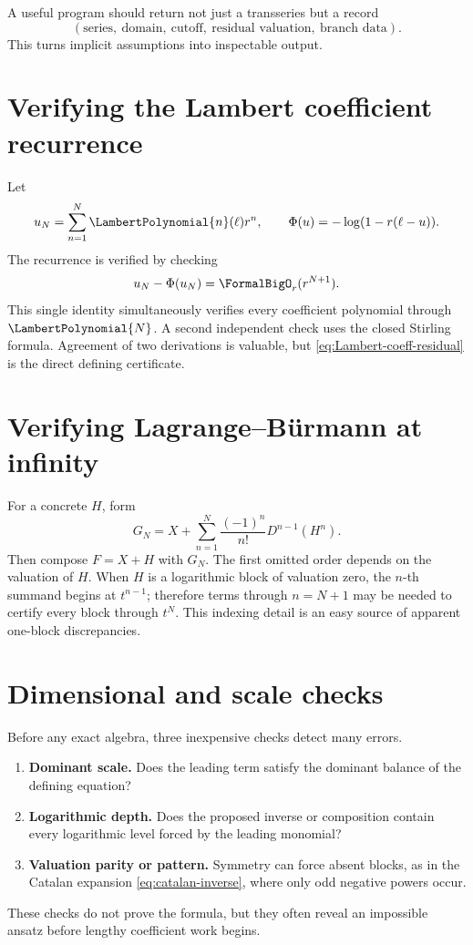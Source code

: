 \documentclass[11pt,openany]{book}
\theoremstyle{definition}
\theoremstyle{plain}
\theoremstyle{remark}
\begin{document}
\begin{algorithmicbox}
A useful program should return not just a transseries but a record
\[
 (\text{series},\ \text{domain},\ \text{cutoff},\ \text{residual valuation},\ \text{branch data}).
\]
This turns implicit assumptions into inspectable output.
\end{algorithmicbox}

\section{Verifying the Lambert coefficient recurrence}
Let
\[
 u_N=\sum_{n=1}^{N}\LambertPolynomial{n}(\ell)r^n,
 \qquad
 \Phi(u)=-\log(1-r(\ell-u)).
\]
The recurrence is verified by checking
\begin{equation}\label{eq:Lambert-coeff-residual}
 u_N-\Phi(u_N)=\FormalBigO_r(r^{N+1}).
\end{equation}
This single identity simultaneously verifies every coefficient polynomial through \(\LambertPolynomial{N}\). A second independent check uses the closed Stirling formula. Agreement of two derivations is valuable, but \cref{eq:Lambert-coeff-residual} is the direct defining certificate.

\section{Verifying Lagrange--B\"urmann at infinity}
For a concrete \(H\), form
\[
 G_N=X+\sum_{n=1}^{N}\frac{(-1)^n}{n!}D^{n-1}(H^n).
\]
Then compose \(F=X+H\) with \(G_N\). The first omitted order depends on the valuation of \(H\). When \(H\) is a logarithmic block of valuation zero, the \(n\)-th summand begins at \(t^{n-1}\); therefore terms through \(n=N+1\) may be needed to certify every block through \(t^N\). This indexing detail is an easy source of apparent one-block discrepancies.

\section{Dimensional and scale checks}
Before any exact algebra, three inexpensive checks detect many errors.
\begin{enumerate}
\item \textbf{Dominant scale.} Does the leading term satisfy the dominant balance of the defining equation?
\item \textbf{Logarithmic depth.} Does the proposed inverse or composition contain every logarithmic level forced by the leading monomial?
\item \textbf{Valuation parity or pattern.} Symmetry can force absent blocks, as in the Catalan expansion \cref{eq:catalan-inverse}, where only odd negative powers occur.
\end{enumerate}
These checks do not prove the formula, but they often reveal an impossible ansatz before lengthy coefficient work begins.
\end{document}
